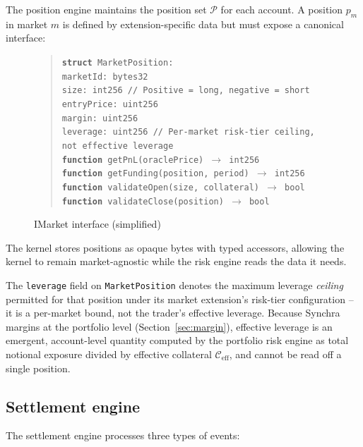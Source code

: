 \documentclass[11pt,a4paper]{article}
\begin{document}
The position engine maintains the position set $\mathcal{P}$ for each account. A position $p_m$ in market $m$ is defined by extension-specific data but must expose a canonical interface:

\begin{figure}[h]
  \caption{IMarket interface (simplified)}
  \label{alg:market}
  \begin{quote}
  \texttt{\textbf{struct} MarketPosition:} \\
  \texttt{\qquad marketId: bytes32} \\
  \texttt{\qquad size: int256 \hfill // Positive = long, negative = short} \\
  \texttt{\qquad entryPrice: uint256} \\
  \texttt{\qquad margin: uint256} \\
  \texttt{\qquad leverage: uint256 \hfill // Per-market risk-tier ceiling, not effective leverage} \\
  \texttt{\textbf{function} getPnL(oraclePrice) $\rightarrow$ int256} \\
  \texttt{\textbf{function} getFunding(position, period) $\rightarrow$ int256} \\
  \texttt{\textbf{function} validateOpen(size, collateral) $\rightarrow$ bool} \\
  \texttt{\textbf{function} validateClose(position) $\rightarrow$ bool}
  \end{quote}
\end{figure}

The kernel stores positions as opaque bytes with typed accessors, allowing the kernel to remain market-agnostic while the risk engine reads the data it needs.

The \texttt{leverage} field on \texttt{MarketPosition} denotes the maximum leverage \emph{ceiling} permitted for that position under its market extension's risk-tier configuration -- it is a per-market bound, not the trader's effective leverage. Because Synchra margins at the portfolio level (Section~\ref{sec:margin}), effective leverage is an emergent, account-level quantity computed by the portfolio risk engine as total notional exposure divided by effective collateral $\mathcal{C}_{\text{eff}}$, and cannot be read off a single position.

\subsection{Settlement engine}

The settlement engine processes three types of events:
\end{document}

